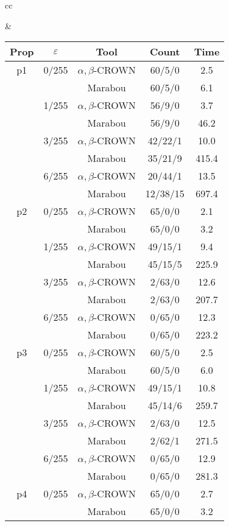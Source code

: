 \begin{table*}[htbp]
\begin{tabular}{cc}
\begin{minipage}{0.48\linewidth}
\end{minipage} &
\begin{minipage}{0.48\linewidth}
\setlength{\extrarowheight}{0pt}
\begin{tabular}{|c|c|c|c|c|}
\hline
Prop & $\varepsilon$ & Tool & Count & Time\\
\hline
p1 & 0/255 & $\alpha, \beta$-CROWN & 60/5/0 & 2.5 \\
 &  & Marabou & 60/5/0 & 6.1 \\
\cline{2-5}
 & 1/255 & $\alpha, \beta$-CROWN & 56/9/0 & 3.7 \\
 &  & Marabou & 56/9/0 & 46.2 \\
\cline{2-5}
 & 3/255 & $\alpha, \beta$-CROWN & 42/22/1 & 10.0 \\
 &  & Marabou & 35/21/9 & 415.4 \\
\cline{2-5}
 & 6/255 & $\alpha, \beta$-CROWN & 20/44/1 & 13.5 \\
 &  & Marabou & 12/38/15 & 697.4 \\
\cline{2-5}
\hline
p2 & 0/255 & $\alpha, \beta$-CROWN & 65/0/0 & 2.1 \\
 &  & Marabou & 65/0/0 & 3.2 \\
\cline{2-5}
 & 1/255 & $\alpha, \beta$-CROWN & 49/15/1 & 9.4 \\
 &  & Marabou & 45/15/5 & 225.9 \\
\cline{2-5}
 & 3/255 & $\alpha, \beta$-CROWN & 2/63/0 & 12.6 \\
 &  & Marabou & 2/63/0 & 207.7 \\
\cline{2-5}
 & 6/255 & $\alpha, \beta$-CROWN & 0/65/0 & 12.3 \\
 &  & Marabou & 0/65/0 & 223.2 \\
\cline{2-5}
\hline
p3 & 0/255 & $\alpha, \beta$-CROWN & 60/5/0 & 2.5 \\
 &  & Marabou & 60/5/0 & 6.0 \\
\cline{2-5}
 & 1/255 & $\alpha, \beta$-CROWN & 49/15/1 & 10.8 \\
 &  & Marabou & 45/14/6 & 259.7 \\
\cline{2-5}
 & 3/255 & $\alpha, \beta$-CROWN & 2/63/0 & 12.5 \\
 &  & Marabou & 2/62/1 & 271.5 \\
\cline{2-5}
 & 6/255 & $\alpha, \beta$-CROWN & 0/65/0 & 12.9 \\
 &  & Marabou & 0/65/0 & 281.3 \\
\cline{2-5}
\hline
p4 & 0/255 & $\alpha, \beta$-CROWN & 65/0/0 & 2.7 \\
 &  & Marabou & 65/0/0 & 3.2 \\

\end{tabular}
\end{minipage}
\end{tabular}
\end{table*}

